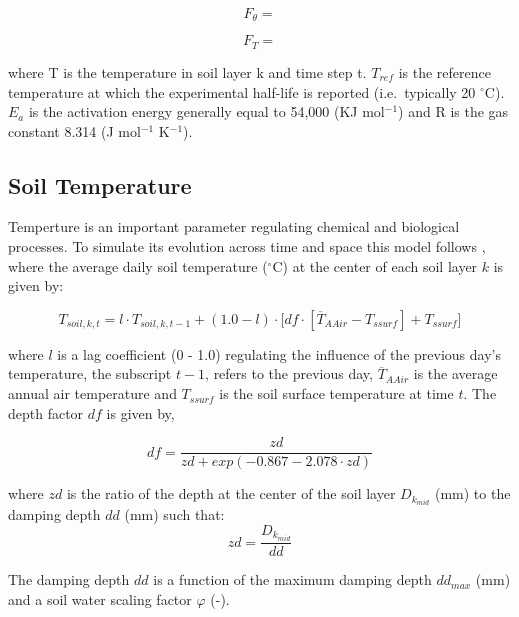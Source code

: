 \documentclass[]{article}
\begin{document}
\begin{equation} 
F_\theta = 
\end{equation}

\begin{equation} 
F_T =
\end{equation}

where T is the temperature in soil layer k and time step t. \(T_{ref}\)
is the reference temperature at which the experimental half-life is
reported (i.e.~typically 20 \(^{\circ}\)C). \(E_a\) is the activation
energy generally equal to 54,000 (KJ mol\(^{-1}\)) and R is the gas
constant 8.314 (J mol\(^{-1}\) K\(^{-1}\)).

\hypertarget{soil-temperature}{%
\subsection{Soil Temperature}\label{soil-temperature}}

Temperture is an important parameter regulating chemical and biological
processes. To simulate its evolution across time and space this model
follows \citep{Neitsch2009}, where the average daily soil temperature
(\(^{\circ}\)C) at the center of each soil layer \(k\) is given by:

\begin{equation}
T_{soil, k, t} = l \cdot T_{soil, k, t-1} + (1.0 - l) \cdot \big[df \cdot [\overline{T}_{AAir} - T_{ssurf}]+T_{ssurf}]
\label{eq:tempSoil} 
\end{equation}

where \(l\) is a lag coefficient (0 - 1.0) regulating the influence of
the previous day's temperature, the subscript \(t-1\), refers to the
previous day, \(\overline{T}_{AAir}\) is the average annual air
temperature and \(T_{ssurf}\) is the soil surface temperature at time
\(t\). The depth factor \(df\) is given by,

\begin{equation}
df = \frac{zd}{zd+exp(-0.867-2.078 \cdot zd)}
\label{eq:df} 
\end{equation}

where \(zd\) is the ratio of the depth at the center of the soil layer
\(D_{k_{mid}}\) (mm) to the damping depth \(dd\) (mm) such that:
\begin{equation}
zd = \frac{D_{k_{mid}}}{dd}
\label{eq:zd} 
\end{equation}

The damping depth \(dd\) is a function of the maximum damping depth
\(dd_{max}\) (mm) and a soil water scaling factor \(\varphi\) (-).
\end{document}
